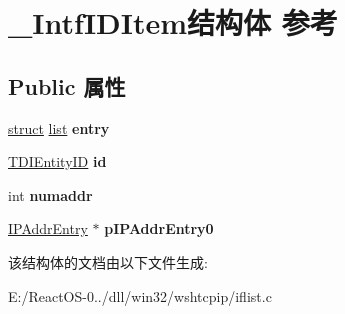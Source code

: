 \hypertarget{struct___intf_i_d_item}{}\section{\+\_\+\+Intf\+I\+D\+Item结构体 参考}
\label{struct___intf_i_d_item}
\subsection*{Public 属性}
\begin{DoxyCompactItemize}
\item 
\mbox{\label{struct___intf_i_d_item_a08c7efb45af029c72548e78cf84ed1b4}} 
\hyperlink{interfacestruct}{struct} \hyperlink{classlist}{list} {\bfseries entry}
\item 
\mbox{\label{struct___intf_i_d_item_accb67dc91f07990eae8cbc56d90223e8}} 
\hyperlink{struct___t_d_i_entity_i_d}{T\+D\+I\+Entity\+ID} {\bfseries id}
\item 
\mbox{\label{struct___intf_i_d_item_a29aa45a45f90e32d7232696cffafdc3e}} 
int {\bfseries numaddr}
\item 
\mbox{\label{struct___intf_i_d_item_a81a17ad1fca6830afc44c91a2b62dda8}} 
\hyperlink{struct_i_p_addr_entry}{I\+P\+Addr\+Entry} $\ast$ {\bfseries p\+I\+P\+Addr\+Entry0}
\end{DoxyCompactItemize}


该结构体的文档由以下文件生成\+:\begin{DoxyCompactItemize}
\item 
E\+:/\+React\+O\+S-\/0../dll/win32/wshtcpip/iflist.\+c\end{DoxyCompactItemize}
